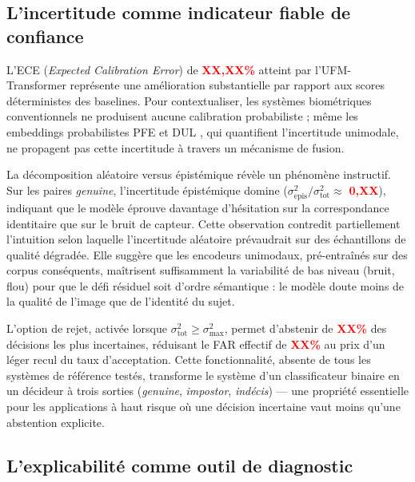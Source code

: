 \documentclass[12pt,a4paper]{report}
\begin{document}
\subsection{L'incertitude comme indicateur fiable de confiance}

L'ECE (\emph{Expected Calibration Error}) de \textcolor{red}{\textbf{XX,XX\%}} atteint par l'UFM-Transformer repr\'{e}sente une am\'{e}lioration substantielle par rapport aux scores d\'{e}terministes des baselines. Pour contextualiser, les syst\`{e}mes biom\'{e}triques conventionnels ne produisent aucune calibration probabiliste ; m\^{e}me les embeddings probabilistes PFE \cite{shi2019pfe} et DUL \cite{chang2020data}, qui quantifient l'incertitude unimodale, ne propagent pas cette incertitude \`{a} travers un m\'{e}canisme de fusion.

La d\'{e}composition al\'{e}atoire versus \'{e}pist\'{e}mique r\'{e}v\`{e}le un ph\'{e}nom\`{e}ne instructif. Sur les paires \emph{genuine}, l'incertitude \'{e}pist\'{e}mique domine ($\sigma^2_{\text{epis}} / \sigma^2_{\text{tot}} \approx$ \textcolor{red}{\textbf{0,XX}}), indiquant que le mod\`{e}le \'{e}prouve davantage d'h\'{e}sitation sur la correspondance identitaire que sur le bruit de capteur. Cette observation contredit partiellement l'intuition selon laquelle l'incertitude al\'{e}atoire pr\'{e}vaudrait sur des \'{e}chantillons de qualit\'{e} d\'{e}grad\'{e}e. Elle sugg\`{e}re que les encodeurs unimodaux, pr\'{e}-entra\^{i}n\'{e}s sur des corpus cons\'{e}quents, ma\^{i}trisent suffisamment la variabilit\'{e} de bas niveau (bruit, flou) pour que le d\'{e}fi r\'{e}siduel soit d'ordre s\'{e}mantique : le mod\`{e}le doute moins de la qualit\'{e} de l'image que de l'identit\'{e} du sujet.

L'option de rejet, activ\'{e}e lorsque $\sigma^2_{\text{tot}} \geq \sigma^2_{\max}$, permet d'abstenir de \textcolor{red}{\textbf{XX\%}} des d\'{e}cisions les plus incertaines, r\'{e}duisant le FAR effectif de \textcolor{red}{\textbf{XX\%}} au prix d'un l\'{e}ger recul du taux d'acceptation. Cette fonctionnalit\'{e}, absente de tous les syst\`{e}mes de r\'{e}f\'{e}rence test\'{e}s, transforme le syst\`{e}me d'un classificateur binaire en un d\'{e}cideur \`{a} trois sorties (\emph{genuine}, \emph{impostor}, \emph{ind\'{e}cis}) --- une propri\'{e}t\'{e} essentielle pour les applications \`{a} haut risque o\`{u} une d\'{e}cision incertaine vaut moins qu'une abstention explicite.

\subsection{L'explicabilit\'{e} comme outil de diagnostic}
\end{document}
